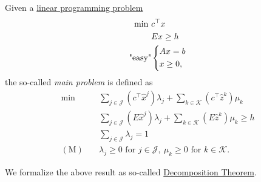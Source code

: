 \begin{definition}\label{def:main-problem}
	Given a \hyperref[def:general-linear-programming-problem]{linear programming problem}
	\[
		\begin{aligned}
			\min~         & c^{\top}x     \\
			              & Ex\geq h      \\
			\text{"easy"} & \begin{dcases}
				                Ax = b \\
				                x\geq 0,
			                \end{dcases}
		\end{aligned}
	\]
	the so-called \emph{main problem} is defined as
	\[
		\begin{aligned}
			\min~             & \sum\limits_{j\in\mathcal{J}}\left(c^{\top}\hat{x}^j\right)\lambda_{j} + \sum\limits_{k\in\mathcal{K}}\left(c^{\top} \hat{z}^k  \right)\mu_k \\
			                  & \sum\limits_{j\in\mathcal{J}}\left(E\hat{x}^j\right)\lambda_{j} + \sum\limits_{k\in\mathcal{K}}\left(E \hat{z}^k \right)\mu_k \geq h         \\
			                  & \sum\limits_{j\in\mathcal{J}}\lambda_{j} = 1                                                                                                 \\
			(\mathrm{M})\quad & \lambda_{j}\geq 0 \text{ for }j\in\mathcal{J},\ \mu_k\geq 0 \text{ for }k\in\mathcal{K}.
		\end{aligned}
	\]
\end{definition}

We formalize the above result as so-called \hyperref[thm:decomposition]{Decomposition Theorem}.

